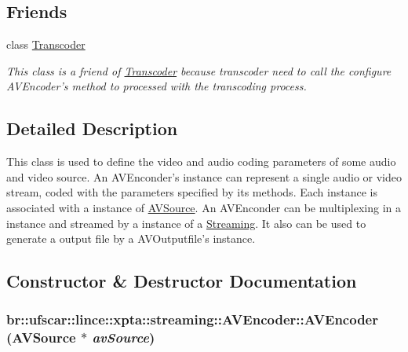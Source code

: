 \subsection*{Friends}
\begin{DoxyCompactItemize}
\item 
class \hyperlink{classbr_1_1ufscar_1_1lince_1_1xpta_1_1streaming_1_1AVEncoder_af9f366fbe5cbc06f38791f120c62c182}{Transcoder}
\begin{DoxyCompactList}\small\item\em This class is a friend of \hyperlink{classbr_1_1ufscar_1_1lince_1_1xpta_1_1streaming_1_1Transcoder}{Transcoder} because transcoder need to call the configure AVEncoder's method to processed with the transcoding process. \item\end{DoxyCompactList}\end{DoxyCompactItemize}


\subsection{Detailed Description}
This class is used to define the video and audio coding parameters of some audio and video source. An AVEnconder's instance can represent a single audio or video stream, coded with the parameters specified by its methods. Each instance is associated with a instance of \hyperlink{classbr_1_1ufscar_1_1lince_1_1xpta_1_1streaming_1_1AVSource}{AVSource}. An AVEnconder can be multiplexing in a instance and streamed by a instance of a \hyperlink{classbr_1_1ufscar_1_1lince_1_1xpta_1_1streaming_1_1Streaming}{Streaming}. It also can be used to generate a output file by a AVOutputfile's instance. 

\subsection{Constructor \& Destructor Documentation}
\hypertarget{classbr_1_1ufscar_1_1lince_1_1xpta_1_1streaming_1_1AVEncoder_a1d1534f7205efbc155a7c4f85a2c6c7b}{
\subsubsection[{AVEncoder}]{\setlength{\rightskip}{0pt plus 5cm}br::ufscar::lince::xpta::streaming::AVEncoder::AVEncoder ({\bf AVSource} $\ast$ {\em avSource})}}
\label{classbr_1_1ufscar_1_1lince_1_1xpta_1_1streaming_1_1AVEncoder_a1d1534f7205efbc155a7c4f85a2c6c7b}


